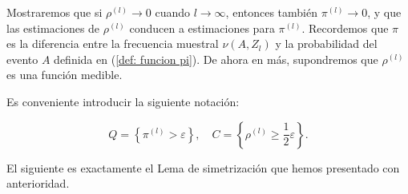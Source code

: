 \documentclass{report}
\begin{document}
Mostraremos que si \( \rho^{(l)} \to 0 \) cuando \( l \to \infty \), entonces también \( \pi^{(l)} \to 0 \), 
y que las estimaciones de \( \rho^{(l)}\) conducen a estimaciones para \( \pi^{(l)} \). Recordemos que $\pi$ es la diferencia
entre la frecuencia muestral $\nu(A,Z_l)$ y la probabilidad del evento $A$ definida en (\ref{def: funcion pi}).
De ahora en más, supondremos que \( \rho^{(l)} \) es una función medible.\newline

Es conveniente introducir la siguiente notación:

\[
Q = \left\{ \pi^{(l)} > \varepsilon \right\}, \quad C = \left\{ \rho^{(l)} \geq \frac{1}{2}\varepsilon \right\}.
\]

El siguiente es exactamente el Lema de simetrización que hemos presentado con anterioridad.\newline
\end{document}
